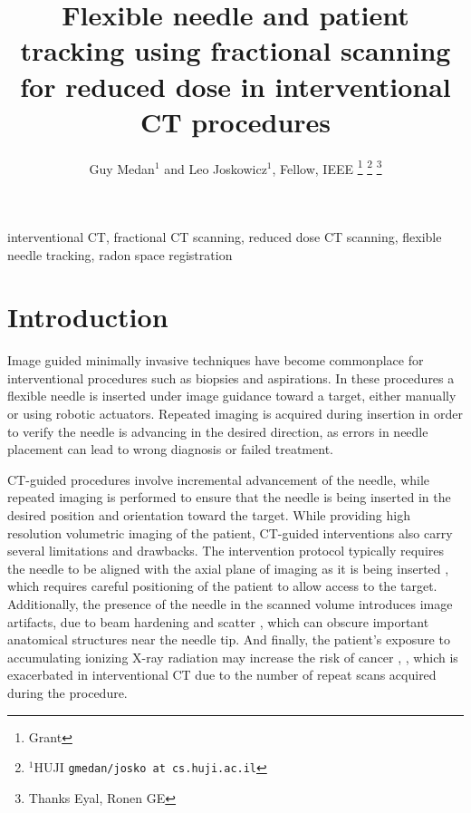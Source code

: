 \documentclass[letterpaper, 11 pt, conference]{ieeeconf}  %
\title{\LARGE \bf
Flexible needle and patient tracking using fractional scanning for reduced dose in interventional CT procedures
}
\author{Guy Medan$^{1}$ and Leo Joskowicz$^{1}$, Fellow, IEEE%
\thanks{Grant}%
\thanks{$^{1}$HUJI
        {\tt\small gmedan/josko at cs.huji.ac.il}}%
\thanks{Thanks Eyal, Ronen GE}%
}
\begin{document}
\maketitle
\thispagestyle{plain}
\pagestyle{plain}


\begin{abstract}
\lipsum[1]

\end{abstract}

\begin{keywords}
interventional CT, fractional CT scanning, reduced dose CT scanning, flexible needle tracking, radon space registration 
\end{keywords}

\section{Introduction}

Image guided minimally invasive techniques have become commonplace for interventional procedures such as biopsies and aspirations.
In these procedures a flexible needle is inserted under image guidance toward a target, either manually or using robotic actuators. Repeated imaging is acquired during insertion in order to verify the needle is advancing in the desired direction, as errors in needle placement can lead to wrong diagnosis or failed treatment.

CT-guided procedures involve incremental advancement of the needle, while repeated imaging is performed to ensure that the needle is being inserted in the desired position and orientation toward the target.
While providing high resolution volumetric imaging of the patient, CT-guided interventions also carry several limitations and drawbacks.
The intervention protocol typically requires the needle to be aligned with the axial plane of imaging as it is being inserted \cite{gupta2014ct}, which requires careful positioning of the patient to allow access to the target.
Additionally, the presence of the needle in the scanned volume introduces image artifacts, due to beam hardening and scatter \cite{boas2012ctartifacts}, which can obscure important anatomical structures near the needle tip.
And finally, the patient's exposure to accumulating ionizing X-ray radiation may increase the risk of cancer \cite{mettler2000ct}, \cite{chodick2007excess}, which is exacerbated in interventional CT due to the number of repeat scans acquired during the procedure.
\end{document}
